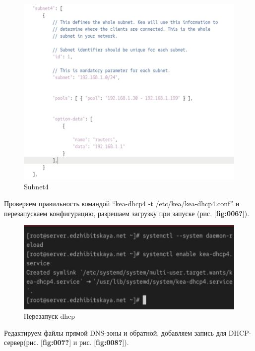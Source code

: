 \documentclass[
  english,
  russian,
  12pt,
  a4paper,
  DIV=11,
  numbers=noendperiod]{scrreprt}
\begin{document}
\begin{figure}

{\centering \includegraphics[width=0.7\linewidth,height=\textheight,keepaspectratio]{image/5.jpg}

}

\caption{Subnet4}

\end{figure}%

Проверяем правильность командой ``kea-dhcp4 -t /etc/kea/kea-dhcp4.conf''
и перезапускаем конфигурацию, разрешаем загрузку при запуске (рис.
{[}\textbf{fig:006?}{]}).

\begin{figure}

{\centering \includegraphics[width=0.7\linewidth,height=\textheight,keepaspectratio]{image/6.jpg}

}

\caption{Перезапуск dhcp}

\end{figure}%

Редактируем файлы прямой DNS-зоны и обратной, добавляем запись для
DHCP-сервер(рис. {[}\textbf{fig:007?}{]} и рис.
{[}\textbf{fig:008?}{]}).
\end{document}

